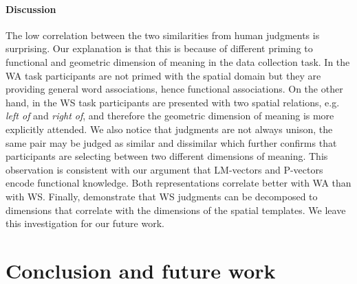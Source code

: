 \paragraph{Discussion} The low correlation between the two similarities from human judgments
is surprising. Our explanation is that this is because of different priming to
functional and geometric dimension of meaning in the data collection task.
In the WA task participants are not primed with the spatial domain but they are
providing general word associations, %
hence functional associations. On the other hand, in the WS task
participants are presented with two spatial relations, e.g. \emph{left of} and
\emph{right of}, and therefore
the geometric dimension of meaning is more explicitly attended.
We also notice that judgments are not always unison, the same pair may be
judged as similar and dissimilar which further confirms that participants are
selecting between two different dimensions of meaning.
This observation is consistent with our argument that LM-vectors
and P-vectors encode functional knowledge. Both representations correlate
better with WA than with WS.
Finally, \cite{logan/sadler:1996} demonstrate that
WS judgments can be decomposed to dimensions that correlate with the dimensions of the spatial templates. We leave this investigation for our
future work.

\section{Conclusion and future work}\label{splu2019:sec:conclusions}

